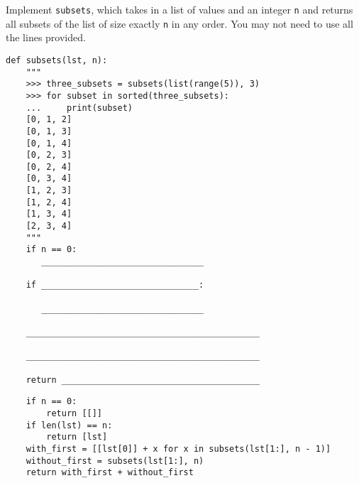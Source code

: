 \begin{blocksection}
\question Implement \lstinline$subsets$, which takes in a list of values and an
integer \lstinline$n$ and returns all subsets of the list of size exactly
\lstinline$n$ in any order. You may not need to use all the lines provided.

\begin{lstlisting}
def subsets(lst, n):
    """
    >>> three_subsets = subsets(list(range(5)), 3)
    >>> for subset in sorted(three_subsets):
    ...     print(subset)
    [0, 1, 2]
    [0, 1, 3]
    [0, 1, 4]
    [0, 2, 3]
    [0, 2, 4]
    [0, 3, 4]
    [1, 2, 3]
    [1, 2, 4]
    [1, 3, 4]
    [2, 3, 4]
    """
    if n == 0:
       ________________________________

    if _______________________________:

       ________________________________

    ______________________________________________

    ______________________________________________

    return _______________________________________

\end{lstlisting}
\end{blocksection}
\begin{blocksection}
\begin{solution}
\begin{lstlisting}
    if n == 0:
        return [[]]
    if len(lst) == n:
        return [lst]
    with_first = [[lst[0]] + x for x in subsets(lst[1:], n - 1)]
    without_first = subsets(lst[1:], n)
    return with_first + without_first
\end{lstlisting}
\end{solution}
\end{blocksection}

